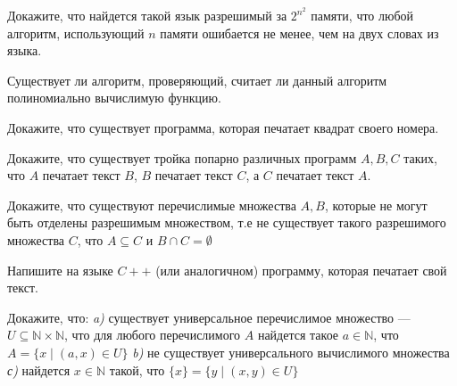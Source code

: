 \setcounter{curtask}{15}


\begin{task}
	Докажите, что найдется такой язык разрешимый за $2^{n^2}$ памяти, что любой
    алгоритм, использующий $n$ памяти ошибается не менее, чем на двух словах из языка.
\end{task}

\begin{task}
    Существует ли алгоритм, проверяющий, считает ли данный алгоритм
    полиномиально вычислимую функцию.
\end{task}

\begin{task}
    Докажите, что существует программа, которая печатает квадрат
    своего номера.
\end{task}

\begin{task}
    Докажите, что существует тройка попарно различных программ $A, B,
    C$ таких, что $A$ печатает текст $B$, $B$ печатает текст $C$, а
    $C$ печатает текст $A$.
\end{task}

\begin{task}
    Докажите, что существуют перечислимые множества $A, B$, которые не
    могут быть отделены разрешимым множеством, т.е не существует
    такого разрешимого множества $C$, что $A \subseteq C$ и $B \cap C
    = \emptyset$
\end{task}

\begin{task}
    Напишите на языке $C++$ (или аналогичном) программу, которая
    печатает свой текст.
\end{task}

\begin{task}
    Докажите, что: {\it a)} существует универсальное перечислимое множество ---
    $U \subseteq \mathbb{N} \times \mathbb{N}$, что для любого
    перечислимого $A$ найдется такое $a \in \mathbb{N}$, что $A = \{x
    \mid (a, x) \in U\}$
    {\it b)} не существует универсального вычислимого множества
    {\it с)} найдется $x \in \mathbb{N}$ такой, что $\{x\} = \{y
    \mid (x, y) \in U\}$
\end{task}